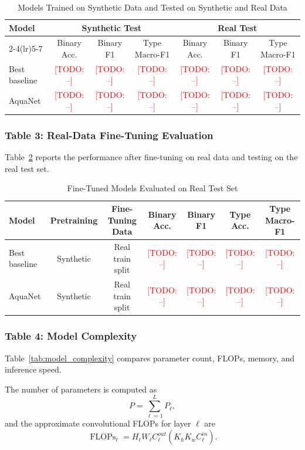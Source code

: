 \documentclass[journal]{IEEEtran}
\newcommand{\todo}[1]{\textcolor{red}{[TODO: #1]}}
\newcommand{\method}{AquaNet}
\begin{document}
\begin{table}[!t]
\centering
\caption{Models Trained on Synthetic Data and Tested on Synthetic and Real Data}
\label{tab:synth_train_transfer}
\begin{tabular}{lcccccc}
\toprule
\multirow{2}{*}{\textbf{Model}} & \multicolumn{3}{c}{\textbf{Synthetic Test}} & \multicolumn{3}{c}{\textbf{Real Test}} \\
\cmidrule(lr){2-4}\cmidrule(lr){5-7}
& Binary Acc. & Binary F1 & Type Macro-F1 & Binary Acc. & Binary F1 & Type Macro-F1 \\
\midrule
Best baseline & \todo{--} & \todo{--} & \todo{--} & \todo{--} & \todo{--} & \todo{--} \\
\method{} & \todo{--} & \todo{--} & \todo{--} & \todo{--} & \todo{--} & \todo{--} \\
\bottomrule
\end{tabular}
\end{table}

\subsubsection{Table 3: Real-Data Fine-Tuning Evaluation}
Table~\ref{tab:real_finetune} reports the performance after fine-tuning on real data and testing on the real test set.

\begin{table}[!t]
\centering
\caption{Fine-Tuned Models Evaluated on Real Test Set}
\label{tab:real_finetune}
\begin{tabular}{lcccccc}
\toprule
\textbf{Model} & \textbf{Pretraining} & \textbf{Fine-Tuning Data} & \textbf{Binary Acc.} & \textbf{Binary F1} & \textbf{Type Acc.} & \textbf{Type Macro-F1} \\
\midrule
Best baseline & Synthetic & Real train split & \todo{--} & \todo{--} & \todo{--} & \todo{--} \\
\method{} & Synthetic & Real train split & \todo{--} & \todo{--} & \todo{--} & \todo{--} \\
\bottomrule
\end{tabular}
\end{table}

\subsubsection{Table 4: Model Complexity}
Table~\ref{tab:model_complexity} compares parameter count, FLOPs, memory, and inference speed.

The number of parameters is computed as
\begin{equation}
P = \sum_{\ell=1}^{L} P_{\ell},
\label{eq:params}
\end{equation}
and the approximate convolutional FLOPs for layer $\ell$ are
\begin{equation}
\operatorname{FLOPs}_{\ell} = H_{\ell}W_{\ell}C_{\ell}^{out}(K_hK_wC_{\ell}^{in}).
\label{eq:flops}
\end{equation}
\end{document}
